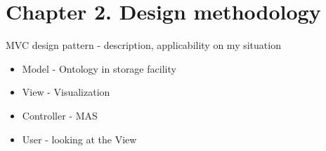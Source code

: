 \chapter{Chapter 2. Design methodology}
MVC design pattern - description, applicability on my situation
\begin{itemize}
\item Model - Ontology in storage facility
\item View - Visualization
\item Controller - MAS
\item User - looking at the View
\end{itemize}

    
    
    
    